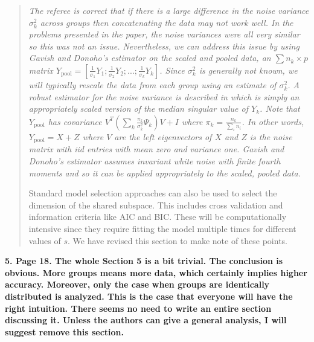 \documentclass{article}
\newenvironment{resp}{\begin{quotation}\noindent\slshape}{\end{quotation}}
\begin{document}
\begin{resp}
  The referee is correct that if there is a large difference in the noise variance $\sigma^2_k$ across groups then concatenating the data may not work well.  In the problems presented in the paper, the noise variances were all very similar so this was not an issue.  Nevertheless, we can address this issue by using Gavish and Donoho's estimator on the \emph{scaled} and pooled data, an $\sum n_k \times p$ matrix $Y_{\text{pool}} = [\frac{1}{\sigma_1}Y_1; \frac{1}{\sigma_2}Y_2;...;  \frac{1}{\sigma_k}Y_k]$.  Since $\sigma^2_k$ is generally not known, we will typically rescale the data from each group using an estimate of $\sigma^2_k$.  A robust estimator for the noise variance is described in \citet{Gavish2014} which is simply an appropriately scaled version of the median singular value of $Y_k$.  Note that $Y_{\text{pool}}$ has covariance $V^T( \sum_k \frac{\pi_k}{\sigma_k^2} \Psi_k)V + I$ where $\pi_k = \frac{n_k}{\sum_i n_i}$.  In other words, $Y_{\text{pool}} = X + Z$ where $V$ are the left eigenvectors of $X$ and $Z$ is the noise matrix with iid entries with mean zero and variance one.  Gavish and Donoho's estimator assumes invariant white noise with finite fourth moments and so it can be applied appropriately to the scaled, pooled data.

Standard model selection approaches can also be used to select the dimension of the shared subspace.  This includes cross validation and information criteria like AIC and BIC.  These will be computationally intensive since they require fitting the model multiple times for different values of $s$.  We have revised this section to make note of these points.


\end{resp}

\noindent \textbf{5. Page 18. The whole Section 5 is a bit trivial. The conclusion is obvious. More groups means more data, which certainly implies higher accuracy. Moreover, only the case when groups are identically distributed is analyzed. This is the case that everyone will have the right intuition. There seems no need to write an entire section discussing it.  Unless the authors can give a general analysis, I will suggest remove this section.}
\end{document}
